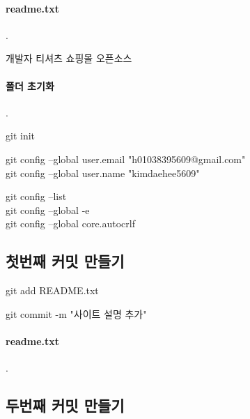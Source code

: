 \documentclass[12pt, a4paper, oneside]{book}
\begin{document}
			\paragraph{readme.txt} 
			.\\

			\begin{tcolorbox}
				개발자 티셔츠 쇼핑몰 오픈소스 
			\end{tcolorbox}

			\paragraph 	{폴더 초기화}
			.\\

			\begin{tcolorbox}
				git init
			\end{tcolorbox}


			\begin{tcolorbox}
				git config --global user.email 	"h01038395609@gmail.com" \\
				git config --global user.name	"kimdaehee5609"
			\end{tcolorbox}


			\begin{tcolorbox}
				git config --list \\
				git config --global -e \\
				git config --global core.autocrlf
			\end{tcolorbox}


		\subsection 	{첫번째 커밋 만들기}

			\begin{tcolorbox}
				git add README.txt
			\end{tcolorbox}



			\begin{tcolorbox}
				git commit -m "사이트 설명 추가"
			\end{tcolorbox}

			\paragraph{readme.txt} 
			.\\


		\subsection 	{두번째 커밋 만들기}
\end{document}
